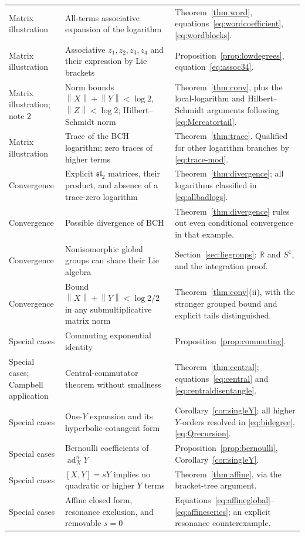 \documentclass[11pt]{article}
\theoremstyle{definition}
\theoremstyle{remark}
\newcommand{\R}{\mathbb R}
\newcommand{\ad}{\operatorname{ad}}
\newcommand{\norm}[1]{\left\lVert #1\right\rVert}
\numberwithin{equation}{section}
\begin{document}
\begin{longtable}{@{}>{\raggedright\arraybackslash}p{}>{\raggedright\arraybackslash}p{}>{\raggedright\arraybackslash}p{}@{}}
Matrix illustration&All-terms associative expansion of the logarithm&Theorem~\ref{thm:word}, equations~\eqref{eq:wordcoefficient}, \eqref{eq:wordblocks}.\\
Matrix illustration&Associative $z_1,z_2,z_3,z_4$ and their expression by Lie brackets&Proposition~\ref{prop:lowdegrees}, equation~\eqref{eq:assoc34}.\\
Matrix illustration; note 2&Norm bounds $\norm X+\norm Y<\log2$, $\norm Z<\log2$; Hilbert--Schmidt norm&Theorem~\ref{thm:conv}, plus the local-logarithm and Hilbert--Schmidt arguments following \eqref{eq:Mercatortail}.\\
Matrix illustration&Trace of the BCH logarithm; zero traces of higher terms&Theorem~\ref{thm:trace}. Qualified for other logarithm branches by \eqref{eq:trace-mod}.\\
Convergence&Explicit $\mathfrak{sl}_2$ matrices, their product, and absence of a trace-zero logarithm&Theorem~\ref{thm:divergence}; all logarithms classified in \eqref{eq:allbadlogs}.\\
Convergence&Possible divergence of BCH&Theorem~\ref{thm:divergence} rules out even conditional convergence in that example.\\
Convergence&Nonisomorphic global groups can share their Lie algebra&Section~\ref{sec:liegroups}: $\R$ and $S^1$, and the integration proof.\\
Convergence&Bound $\norm X+\norm Y<\log2/2$ in any submultiplicative matrix norm&Theorem~\ref{thm:conv}(ii), with the stronger grouped bound and explicit tails distinguished.\\
Special cases&Commuting exponential identity&Proposition~\ref{prop:commuting}.\\
Special cases; Campbell application&Central-commutator theorem without smallness&Theorem~\ref{thm:central}; equations~\eqref{eq:central} and \eqref{eq:centraldisentangle}.\\
Special cases&One-$Y$ expansion and its hyperbolic-cotangent form&Corollary~\ref{cor:singleY}; all higher $Y$-orders resolved in \eqref{eq:bidegree}, \eqref{eq:Qrecursion}.\\
Special cases&Bernoulli coefficients of $\ad_X^nY$&Proposition~\ref{prop:bernoulli}, Corollary~\ref{cor:singleY}.\\
Special cases&$[X,Y]=sY$ implies no quadratic or higher $Y$ terms&Theorem~\ref{thm:affine}, via the bracket-tree argument.\\
Special cases&Affine closed form, resonance exclusion, and removable $s=0$&Equations~\eqref{eq:affineglobal}--\eqref{eq:affineseries}; an explicit resonance counterexample.\\

\end{longtable}
\end{document}
